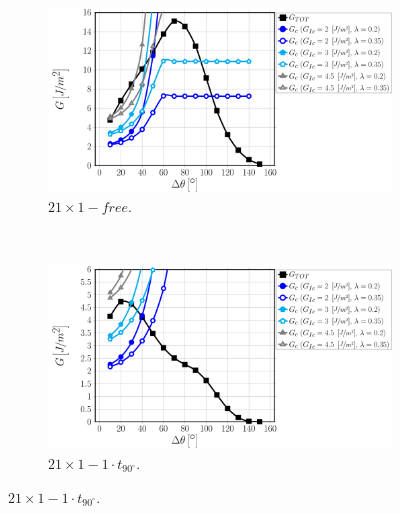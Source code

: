 \begin{figure}[!htbp]
\centering
    \begin{subfigure}[b]{0.475\textwidth}
        \includegraphics[width=\textwidth]{paperE/vf60-dsize-S10A0.pdf}
        \caption{$21\times 1-free$.}\label{paperE:fig:debondsize-a}
    \end{subfigure} ~
    \begin{subfigure}[b]{0.475\textwidth}
        \includegraphics[width=\textwidth]{paperE/vf60-dsize-S10A0T1.pdf}
        \caption{$21\times 1-1\cdot t_{90^{\circ}}$.}\label{paperE:fig:debondsize-b}
    \end{subfigure}


\end{figure}
